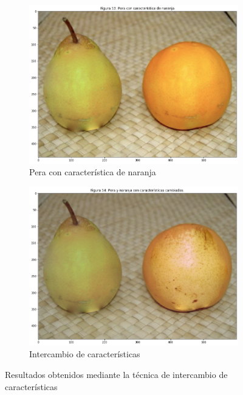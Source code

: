 \documentclass[11pt,twoside,titlepage,a4paper]{article}
\numberwithin{equation}{section} %
\theoremstyle{usual}
\begin{document}
\begin{figure}[h]
    \centering
    \begin{subfigure}[t]{.37\textwidth}
        \centering
        \includegraphics[width=\textwidth]{imagenes/PoissonImageEditing_cell_61_output_6.png}
        \caption{Pera con característica de naranja}
        \label{fig:peraAnaranjada}
    \end{subfigure}
    \centering
    \begin{subfigure}[t]{.37\textwidth}
        \centering
        \includegraphics[width=\textwidth]{imagenes/PoissonImageEditing_cell_61_output_7.png}
        \caption{Intercambio de características}
        \label{fig:intercambioCaracteristicas}
    \end{subfigure}
    \caption{Resultados obtenidos mediante la técnica de intercambio de características}
    \label{fig:resultadosIntercambioCaracteristicas}
\end{figure}
\end{document}

